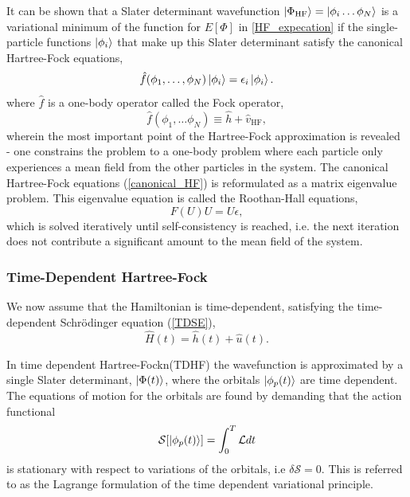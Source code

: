 \documentclass[aip,jcp,reprint,floatfix]{revtex4-1}
\begin{document}
It can be shown that a Slater determinant wavefunction $\ket{\Phi_\text{HF}} = \ket{\phi_i \dots \phi_N}$ is a variational minimum of the function for $E[\Phi]$ in \autoref{HF_expecation} if the single-particle functions $\ket{\phi_i}$ that make up this Slater determinant satisfy the canonical Hartree-Fock equations,
\begin{equation}
    \label{canonical_HF}
    \hat{f}(\phi_1, \dots , \phi_N)\ket{\phi_i} = \epsilon_i \ket{\phi_i}.
\end{equation}
where $\hat{f}$ is a one-body operator called the Fock operator,
\begin{equation}
    \hat{f}(\phi_1, \dots \phi_N) \equiv \hat{h} + \hat{v}_{\text{HF}},
\end{equation}
wherein the most important point of the Hartree-Fock approximation is revealed - one constrains the problem to a one-body problem where each particle only experiences a mean field from the other particles in the system. The canonical Hartree-Fock equations (\autoref{canonical_HF}) is reformulated as a matrix eigenvalue problem. This eigenvalue equation is called the Roothan-Hall equations,
\begin{equation}
    \label{roothan_hall}
    F(U)U = U\epsilon,
\end{equation}
which is solved iteratively until self-consistency is reached, i.e. the next iteration does not contribute a significant amount to the mean field of the system.

\subsubsection{Time-Dependent Hartree-Fock}

We now assume that the Hamiltonian is time-dependent, satisfying the time-dependent Schrödinger equation (\autoref{TDSE}),
\begin{equation}
    \hat{H}(t) = \hat{h}(t) + \hat{u}(t).
\end{equation}

In time dependent Hartree-Fockn(TDHF) the wavefunction is approximated by a single Slater determinant, $\ket{\Phi(t)}$, where the orbitals $\ket{\phi_p(t)}$ are time dependent. The equations of motion for the orbitals are found by demanding that the action functional 
\begin{equation}
    \mathcal{S}[\ket{\phi_p(t)}] = \int_0^T \mathcal{L} dt 
\end{equation}
is stationary with respect to variations of the orbitals, i.e $\delta \mathcal{S} = 0$. This is referred to as the Lagrange formulation of the time dependent variational principle\cite{Hochstuhl2014}. 
\end{document}
